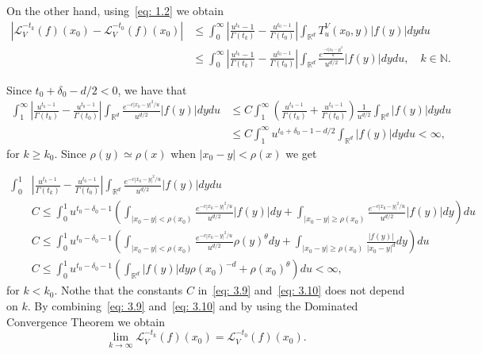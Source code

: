\documentclass[10pt, a4paper, reqno]{amsart}
\theoremstyle{definition}
\theoremstyle{remark}
\newcommand{\RR}{\mathbb{R}}
\newcommand{\NN}{\mathbb{N}}
\numberwithin{equation}{section}
\begin{document}
On the other hand, using~\eqref{eq: 1.2} we obtain 
\begin{equation*}
    \begin{split}
        |\mathcal{L}_V^{-t_k}(f)(x_0) - \mathcal{L}_V^{-t_0}(f)(x_0)| & \leq \int_{0}^\infty \left| \frac{u^{t_k}-1}{\Gamma(t_k)} - \frac{u^{t_0-1}}{\Gamma(t_0)}\right| \int_{\RR^d} T_u^V(x_0,y)|f(y)| dy du
        \\ & \leq \int_{0}^\infty \left| \frac{u^{t_k}-1}{\Gamma(t_k)} - \frac{u^{t_0-1}}{\Gamma(t_0)}\right| \int_{\RR^d} \frac{e^{\frac{-c|x_0-y|^2}{u}}}{u^{d/2}}|f(y)| dy du, \quad k\in \NN.
    \end{split}
\end{equation*}

Since $t_0+\delta_0-d/2<0$, we have that 
\begin{equation}\label{eq: 3.9}
\begin{split}
    \int_1^\infty \left| \frac{u^{t_k - 1}}{\Gamma(t_k)} - \frac{u^{t_0 - 1}}{\Gamma(t_0)} \right| \int_{\mathbb{R}^d} \frac{e^{-c|x_0 -y|^2/u}}{u^{d/2}} |f(y)| dy du
    &  \leq C \int_1^{\infty} \left( \frac{u^{t_k - 1}}{\Gamma(t_k)} + \frac{u^{t_0 - 1}}{\Gamma(t_0)} \right) \frac{1}{u^{d/2}} \int_{\RR^d} |f(y)| dy du
    \\ & \leq C \int_1^\infty u^{t_0+\delta_0-1-d/2} \int_{\RR^d} |f(y)| dy du <\infty, 
\end{split}
\end{equation}
for $k\geq k_0$. Since $\rho(y)\simeq \rho(x)$ when $|x_0 - y| < \rho(x)$ we get

\begin{equation}\label{eq: 3.10}
    \begin{split}
\int_0^1 & \left| \frac{u^{t_k-1}}{\Gamma(t_k)} - \frac{u^{t_0-1}}{\Gamma(t_0)}\right|  \int_{\RR^d} \frac{e^{-c|x_0-y|^2/u}}{u^{d/2}} |f(y)| dy du
 \\ & C\leq \int_0^1 u^{t_0 - \delta_0 -1} \left( \int_{|x_0 - y|<\rho(x_0)}  \frac{e^{-c|x_0-y|^2/u}}{u^{d/2}} |f(y)| dy   + \int_{|x_0 - y|\geq\rho(x_0)}  \frac{e^{-c|x_0-y|^2/u}}{u^{d/2}} |f(y)| dy 
\right) du
\\ & C\leq \int_0^1 u^{t_0 - \delta_0 -1} \left( \int_{|x_0 - y|<\rho(x_0)}  \frac{e^{-c|x_0-y|^2/u}}{u^{d/2}} \rho(y)^\theta dy   + \int_{|x_0 - y|\geq\rho(x_0)}  \frac{|f(y)|}{|x_0 - y|^d} dy 
\right) du
\\ & C\leq \int_0^1 u^{t_0 - \delta_0 -1} \left( \int_{\RR^d}  |f(y)| dy \rho(x_0)^{-d} + \rho(x_0)^\theta  
\right) du <\infty,
\end{split}
\end{equation}
for $k<k_0$. Nothe that the constants $C$ in~\eqref{eq: 3.9} and~\eqref{eq: 3.10} does not depend on $k$. 
By combining~\eqref{eq: 3.9} and~\eqref{eq: 3.10} and by using the Dominated Convergence Theorem we obtain
\begin{equation}\label{eq: 3.11}
    \lim_{k\rightarrow \infty} \mathcal{L}_V^{-t_k} (f)(x_0) = \mathcal{L}_V^{-t_0} (f)(x_0).
\end{equation}
\end{document}
